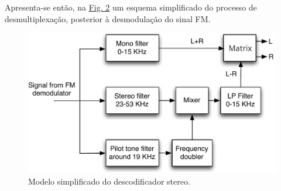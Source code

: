 Apresenta-se então, na \hyperref[fig:desmodulador FM stereo]{Fig. 2} um esquema simplificado do processo de desmultiplexaç\~ao, posterior à desmodulaç\~ao do sinal FM.

\begin{figure}[H]
    \centering
    \includegraphics[width = 0.6\linewidth]{img/stereo_demultiplexing.jpeg}
    \caption{Modelo simplificado do descodificador stereo.}
    \label{fig:desmodulador FM stereo}
\end{figure}
